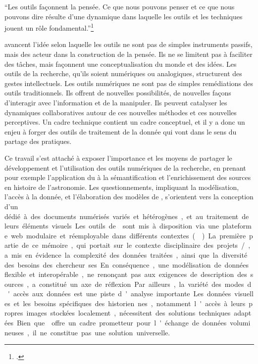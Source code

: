 \begin{kwote}
``Les outils façonnent la pensée. Ce que nous pouvons penser et ce que nous pouvons dire résulte d’une dynamique dans laquelle les outils et les techniques jouent un rôle fondamental.''\footcite[p.31]{epron_ledition_2018}
\end{kwote}

\citeauthor{epron_ledition_2018} avancent l'idée selon laquelle les outils ne sont pas de simples instruments passifs, mais des acteur dans la construction de la pensée. Ils ne se limitent pas à faciliter des tâches, mais façonnent une conceptualisation du monde et des idées. Les outils de la recherche, qu'ils soient numériques ou analogiques, structurent des gestes intellectuels. Les outils numériques ne sont pas de simples remédiations des outils traditionnels. Ils offrent de nouvelles possibilités, de nouvelles façons d'interagir avec l'information et de la manipuler. Ils peuvent catalyser les dynamiques collaboratives autour de ces nouvelles méthodes et ces nouvelles perceptives. Un cadre technique contient un cadre conceptuel, et il y a donc un enjeu à forger des outils de traitement de la donnée qui vont dans le sens du partage des pratiques.

Ce travail s'est attaché à exposer l'importance et les moyens de partager le développement et l'utilisation des outils numériques de la recherche, en prenant pour exemple l'application du \dl à la sémantification et l'enrichissement des sources en histoire de l'astronomie. Les questionnements, impliquant la modélisation, l'accès à la donnée, et l'élaboration des modèles de \cv, s'orientent vers la conception d'un \si dédié à des documents numérisés variés et hétérogènes, et au traitement de leurs éléments visuels. Les outils de \dl sont mis à disposition via une plateforme web modulaire et réemployable dans différents contextes (\aikon).

La première partie de ce mémoire, qui portait sur le contexte disciplinaire des projets \eida/\vhs, a mis en évidence la complexité des données traitées, ainsi que la diversité des besoins des chercheur.ses. En conséquence, une modélisation de données flexible et interopérable, ne renonçant pas aux exigences de description des sources, a constitué un axe de réflexion. Par ailleurs, la variété des modes d'accès aux données est une piste d'analyse importante. Les données visuelles et les besoins spécifiques des historien.nes, notamment l'accès à leurs propres images stockées localement, nécessitent des solutions techniques adaptées. Bien que \iiif offre un cadre prometteur pour l'échange de données volumineuses, il ne constitue pas une solution universelle.

